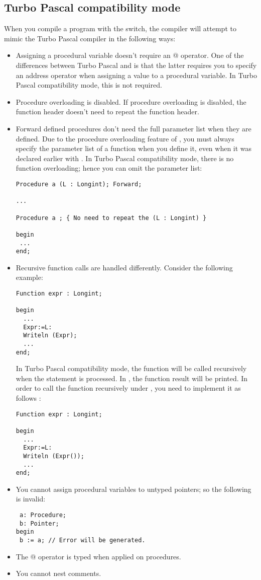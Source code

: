 \subsection{Turbo Pascal compatibility mode}
When you compile a program with the  switch, the compiler will
attempt to mimic the Turbo Pascal compiler in the following ways:
\begin{itemize}
\item Assigning a procedural variable doesn't require an @ operator. One of
the differences between Turbo Pascal and \fpc is that the latter requires
you to specify an address operator when assigning a value to a procedural
variable. In Turbo Pascal compatibility mode, this is not required.
\item Procedure overloading is disabled. If procedure overloading is
disabled, the function header doesn't need to repeat the function header.

\item Forward defined procedures don't need the full parameter list when
they are defined. Due to the procedure overloading feature of \fpc, you must
always specify the parameter list of a function when you define it, even
when it was declared earlier with . In Turbo Pascal
compatibility mode, there is no function overloading; hence you can omit the
parameter list:
\begin{verbatim}
Procedure a (L : Longint); Forward;

...

Procedure a ; { No need to repeat the (L : Longint) }

begin
 ...
end;

\end{verbatim}
\item Recursive function calls are handled differently. Consider the
following example:
\begin{verbatim}
Function expr : Longint;

begin
  ...
  Expr:=L:
  Writeln (Expr);
  ...
end;
\end{verbatim}
In Turbo Pascal compatibility mode, the function will be called recursively
when the  statement is processed. In \fpc, the function result
will be printed. In order to call the function recursively under \fpc, you
need to implement it as follows :
\begin{verbatim}
Function expr : Longint;

begin
  ...
  Expr:=L:
  Writeln (Expr());
  ...
end;
\end{verbatim}
\item You cannot assign procedural variables to untyped pointers; so the
following is invalid:
\begin{verbatim}
 a: Procedure;
 b: Pointer;
begin
 b := a; // Error will be generated.
\end{verbatim}
\item The @ operator is typed when applied on procedures.
\item You cannot nest comments.
\end{itemize}

